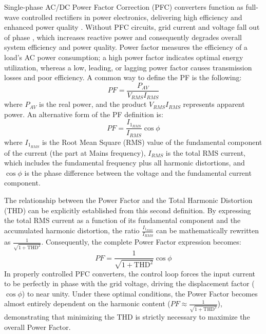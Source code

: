 \documentclass[DIV=calc, paper=a4, fontsize=11pt, twocolumn]{scrartcl}	 %
\begin{document}
Single-phase AC/DC Power Factor Correction (PFC) converters function as full-wave controlled rectifiers in power electronics, delivering high efficiency and enhanced power quality \cite{survey_topologies}. Without PFC circuits, grid current and voltage fall out of phase \cite{TU}, which increases reactive power and consequently degrades overall system efficiency and power quality. Power factor measures the efficiency of a load's AC power consumption; a high power factor indicates optimal energy utilization, whereas a low, leading, or lagging power factor causes transmission losses and poor efficiency. A common way to define the PF is the following:
\begin{equation}
	PF = \frac{P_{AV}}{V_{RMS} I_{RMS}}
\end{equation}
where \textbf{$P_{AV}$} is the real power, and the product \textbf{$V_{RMS} I_{RMS}$} represents apparent power. An alternative form of the PF definition is:
\begin{equation}
	PF = \frac{I_{1_{RMS}}}{I_{RMS}} \cos{\phi}
\end{equation}
where \textbf{$I_{1_{RMS}}$} is the Root Mean Square (RMS) value of the fundamental component of the current (the part at Mains frequency), \textbf{$I_{RMS}$} is the total RMS current, which includes the fundamental frequency plus all harmonic distortions, and \textbf{$\cos{\phi}$} is the phase difference between the voltage and the fundamental current component.

The relationship between the Power Factor and the Total Harmonic Distortion (THD) can be explicitly established from this second definition. By expressing the total RMS current as a function of its fundamental component and the accumulated harmonic distortion, the ratio $\frac{I_{1_{RMS}}}{I_{RMS}}$ can be mathematically rewritten as $\frac{1}{\sqrt{1 + \text{THD}^2}}$. Consequently, the complete Power Factor expression becomes:
\begin{equation}
    PF = \frac{1}{\sqrt{1 + \text{THD}^2}} \cos{\phi}
\end{equation}
In properly controlled PFC converters, the control loop forces the input current to be perfectly in phase with the grid voltage, driving the displacement factor ($\cos{\phi}$) to near unity. Under these optimal conditions, the Power Factor becomes almost entirely dependent on the harmonic content ($PF \approx \frac{1}{\sqrt{1 + \text{THD}^2}}$), demonstrating that minimizing the THD is strictly necessary to maximize the overall Power Factor.
\end{document}
